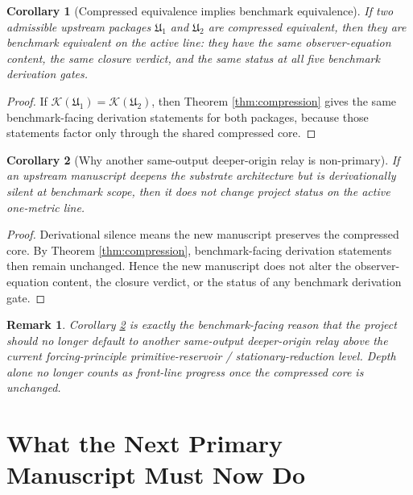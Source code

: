 \documentclass[11pt]{article}
\newcommand{\CompressionMap}{\mathcal K}
\newcommand{\UpstreamPackage}{\mathfrak U}
\newtheorem{remark}{Remark}
\newtheorem{corollary}{Corollary}
\begin{document}
\begin{corollary}[Compressed equivalence implies benchmark equivalence]
\label{cor:equiv}
If two admissible upstream packages \(\UpstreamPackage_1\) and \(\UpstreamPackage_2\) are compressed equivalent, then they are benchmark equivalent on the active line: they have the same observer-equation content, the same closure verdict, and the same status at all five benchmark derivation gates.
\end{corollary}

\begin{proof}
If \(\CompressionMap(\UpstreamPackage_1)=\CompressionMap(\UpstreamPackage_2)\), then Theorem \ref{thm:compression} gives the same benchmark-facing derivation statements for both packages, because those statements factor only through the shared compressed core.
\end{proof}

\begin{corollary}[Why another same-output deeper-origin relay is non-primary]
\label{cor:neutral}
If an upstream manuscript deepens the substrate architecture but is derivationally silent at benchmark scope, then it does not change project status on the active one-metric line.
\end{corollary}

\begin{proof}
Derivational silence means the new manuscript preserves the compressed core. By Theorem \ref{thm:compression}, benchmark-facing derivation statements then remain unchanged. Hence the new manuscript does not alter the observer-equation content, the closure verdict, or the status of any benchmark derivation gate.
\end{proof}

\begin{remark}
Corollary \ref{cor:neutral} is exactly the benchmark-facing reason that the project should no longer default to another same-output deeper-origin relay above the current forcing-principle primitive-reservoir / stationary-reduction level. Depth alone no longer counts as front-line progress once the compressed core is unchanged.
\end{remark}

\section{What the Next Primary Manuscript Must Now Do}
\end{document}
